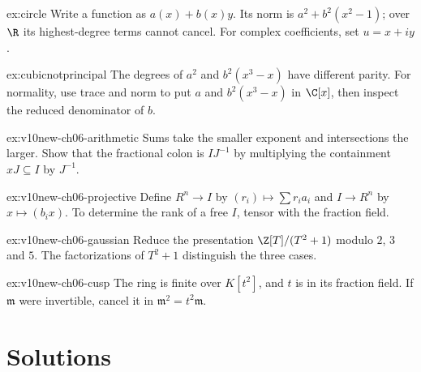 \begin{hint}{ex:circle}
Write a function as $a(x)+b(x)y$. Its norm is $a^2+b^2(x^2-1)$; over $\R$ its highest-degree terms cannot cancel. For complex coefficients, set $u=x+iy$.
\end{hint}

\begin{hint}{ex:cubicnotprincipal}
The degrees of $a^2$ and $b^2(x^3-x)$ have different parity. For normality, use trace and norm to put $a$ and $b^2(x^3-x)$ in $\C[x]$, then inspect the reduced denominator of $b$.
\end{hint}

\begin{hint}{ex:v10new-ch06-arithmetic}
Sums take the smaller exponent and intersections the larger. Show that the fractional colon is $IJ^{-1}$ by multiplying the containment $xJ\subseteq I$ by $J^{-1}$.
\end{hint}

\begin{hint}{ex:v10new-ch06-projective}
Define $R^n\to I$ by $(r_i)\mapsto\sum r_i a_i$ and $I\to R^n$ by $x\mapsto(b_i x)$. To determine the rank of a free $I$, tensor with the fraction field.
\end{hint}

\begin{hint}{ex:v10new-ch06-gaussian}
Reduce the presentation $\Z[T]/(T^2+1)$ modulo $2$, $3$ and $5$. The factorizations of $T^2+1$ distinguish the three cases.
\end{hint}

\begin{hint}{ex:v10new-ch06-cusp}
The ring is finite over $K[t^2]$, and $t$ is in its fraction field. If $\mathfrak m$ were invertible, cancel it in $\mathfrak m^2=t^2\mathfrak m$.
\end{hint}

\section{Solutions}

